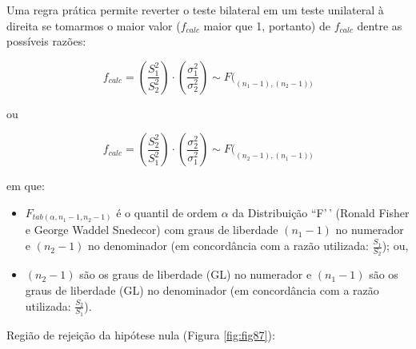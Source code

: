 \documentclass[
]{book}
\providecommand{\tightlist}{%
  \setlength{\itemsep}{0pt}\setlength{\parskip}{0pt}}
\begin{document}
\hfill\break

Uma regra prática permite reverter o teste bilateral em um teste unilateral à direita se tomarmos o maior valor (\(f_{calc}\) maior que 1, portanto) de \(f_{calc}\) dentre as possíveis razões:

\hfill\break

\[
f_{calc} =  (\frac{{S}_{1}^{2}}{{S}_{2}^{2}})\cdot (\frac{{\sigma }_{1}^{2}}{{\sigma }_{2}^2}) \sim F(_{(n_{1} -1), (n_{2} -1))} 
\]

ou

\[
f_{calc} =  (\frac{{S}_{2}^{2}}{{S}_{1}^{2}})\cdot (\frac{{\sigma }_{2}^{2}}{{\sigma }_{1}^2}) \sim F(_{(n_{2} -1), (n_{1} -1))}
\]

\hfill\break

em que:

\hfill\break

\begin{itemize}
\tightlist
\item
  \({F}_{tab\left(\alpha ,{n}_{1}-1,{n}_{2}-1\right)}\) é o quantil de ordem \(\alpha\) da Distribuição ``F'\,' (Ronald Fisher e George Waddel Snedecor) com graus de liberdade \((n_{1}-1)\) no numerador e \((n_{2}-1)\) no denominador (em concordância com a razão utilizada: \(\frac{S_{1}}{S_{2}}\)); ou,
\item
  \((n_{2}-1)\) são os graus de liberdade (GL) no numerador e \((n_{1}-1)\) são os graus de liberdade (GL) no denominador (em concordância com a razão utilizada: \(\frac{S_{2}}{S_{1}}\)).
\end{itemize}

\hfill\break

Região de rejeição da hipótese nula (Figura \ref{fig:fig87}):

\hfill\break
\end{document}
